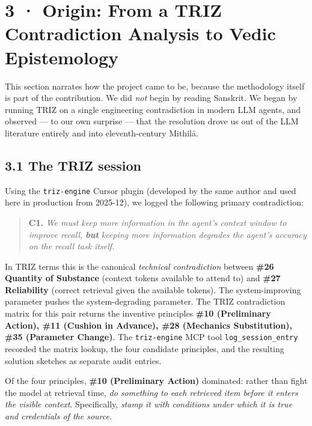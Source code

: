 \section{3 · Origin: From a TRIZ Contradiction Analysis to Vedic Epistemology}\label{origin-from-a-triz-contradiction-analysis-to-vedic-epistemology}

This section narrates how the project came to be, because the methodology itself is part of the contribution. We did \emph{not} begin by reading Sanskrit. We began by running TRIZ \citep{altshuller1984creativity, altshuller2002innovation, terninko1998triz, savransky2000triz} on a single engineering contradiction in modern LLM agents, and observed --- to our own surprise --- that the resolution drove us out of the LLM literature entirely and into eleventh-century Mithilā.

\subsection{3.1 The TRIZ session}\label{the-triz-session}

Using the \texttt{triz-engine} Cursor plugin \citep{trizengineplugin} (developed by the same author and used here in production from 2025-12), we logged the following primary contradiction:

\begin{quote}
\textbf{C1.} \emph{We must keep more information in the agent's context window to improve recall, \textbf{but} keeping more information degrades the agent's accuracy on the recall task itself.}
\end{quote}

In TRIZ terms this is the canonical \emph{technical contradiction} between \textbf{\#26 Quantity of Substance} (context tokens available to attend to) and \textbf{\#27 Reliability} (correct retrieval given the available tokens). The system-improving parameter pushes the system-degrading parameter. The TRIZ contradiction matrix \citep{altshuller2002innovation} for this pair returns the inventive principles \textbf{\#10 (Preliminary Action), \#11 (Cushion in Advance), \#28 (Mechanics Substitution), \#35 (Parameter Change)}. The \texttt{triz-engine} MCP tool \texttt{log\_session\_entry} recorded the matrix lookup, the four candidate principles, and the resulting solution sketches as separate audit entries.

Of the four principles, \textbf{\#10 (Preliminary Action)} dominated: rather than fight the model at retrieval time, \emph{do something to each retrieved item before it enters the visible context}. Specifically, \emph{stamp it with conditions under which it is true and credentials of the source.}

